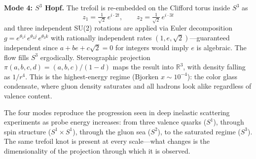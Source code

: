 \documentclass[12pt]{article}
\begin{document}
\textbf{Mode 4: $S^3$ Hopf.} The trefoil is re-embedded on the Clifford torus inside $S^3$ as
$$z_1 = \tfrac{1}{\sqrt{2}}\,e^{i \cdot 2t}, \qquad z_2 = \tfrac{1}{\sqrt{2}}\,e^{i \cdot 3t}$$
and three independent SU(2) rotations are applied via Euler decomposition $g = e^{\theta_1 i}\,e^{\theta_2 j}\,e^{\theta_3 k}$ with rationally independent rates $(1, e, \sqrt{2})$---guaranteed independent since $a + be + c\sqrt{2} = 0$ for integers would imply $e$ is algebraic. The flow fills $S^3$ ergodically. Stereographic projection $\pi(a,b,c,d) = (a,b,c)/(1-d)$ maps the result into $\mathbb{R}^3$, with density falling as $1/r^4$. This is the highest-energy regime (Bjorken $x \sim 10^{-4}$): the color glass condensate, where gluon density saturates and all hadrons look alike regardless of valence content.

\medskip
The four modes reproduce the progression seen in deep inelastic scattering experiments as probe energy increases: from three valence quarks ($S^1$), through spin structure ($S^1 \times S^1$), through the gluon sea ($S^2$), to the saturated regime ($S^3$). The same trefoil knot is present at every scale---what changes is the dimensionality of the projection through which it is observed.


\end{document}
